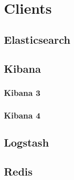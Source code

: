 \documentclass{article}
\begin{document}
\section{Clients}
\subsection{Elasticsearch}
\subsection{Kibana}
\subsubsection{Kibana 3}

\subsubsection{Kibana 4}

\subsection{Logstash}

\subsection{Redis}
\end{document}
